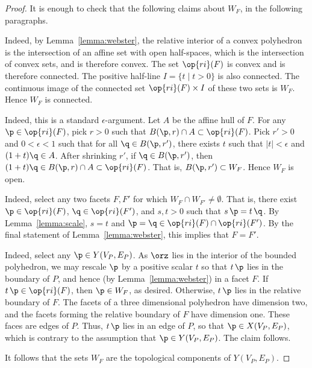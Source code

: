\begin{proof} It is enough to check that the following claims
about $W_F$,  in the following paragraphs.

 Indeed, by Lemma~\ref{lemma:webster},
the relative interior of a convex polyhedron is the intersection of
an affine set with open half-spaces, which is the intersection of
convex sets, and is therefore convex. The set $\op{ri}(F)$ is
convex and is therefore connected.  The positive half-line $I=\{t\mid t>0\}$
is also connected.  The continuous image of the connected set
$\op{ri}(F)\times I$ of these two sets is $W_F$.  Hence $W_F$ is
connected.

  Indeed, this is a standard
$\epsilon$-argument.  Let $A$ be the affine hull of $F$.  For any
$\p\in \op{ri}(F)$, pick $r>0$ such that $B(\p,r)\cap A\subset
\op{ri}(F)$.  Pick $r'>0$ and $0<\epsilon<1$ such that for all
$\q\in B(\p,r')$, there exists $t$ such that $|t|<\epsilon$ and
$(1+t)\q\in A$.  After shrinking $r'$, if $\q\in B(\p,r')$, then
$(1+t)\q \in B(\p,r)\cap A \subset \op{ri}(F)$.  That is,
$B(\p,r')\subset W_F$.  Hence $W_F$ is open.

  Indeed, select any two facets $F,F'$ for
which $W_F\cap W_{F'}\ne \emptyset$.  That is, there exist $\p\in
\op{ri}(F)$, $\q\in \op{ri}(F')$, and $s,t>0$ such that $s\, \p = t\,
\q$.  By Lemma~\ref{lemma:scale}, $s=t$ and $\p=\q\in \op{ri}(F)\cap
\op{ri}(F')$.  By the final statement of Lemma~\ref{lemma:webster},
this implies that $F=F'$.

  Indeed,
select any $\p\in Y(V_P,E_P)$.  As $\orz$ lies in the interior of
the bounded polyhedron, we may rescale $\p$ by a positive scalar $t$
so that $t\, \p$ lies in the boundary of $P$, and hence (by
Lemma~\ref{lemma:webster}) in a facet $F$.  If $t\, \p \in
\op{ri}(F)$, then $\p\in W_F$, as desired.  Otherwise, $t\, \p$ lies
in the relative boundary of $F$.  The facets of a three dimensional
polyhedron have dimension two, and the facets forming the relative
boundary of $F$ have dimension one.  These faces are edges of $P$.
Thus, $t\, \p$ lies in an edge of $P$, so that $\p\in X(V_P,E_P)$,
which is contrary to the assumption that $\p\in Y(V_P,E_P)$.  The
claim follows.

It follows that the sets $W_F$ are the
topological components of $Y(V_P,E_P)$.
\end{proof}
%


